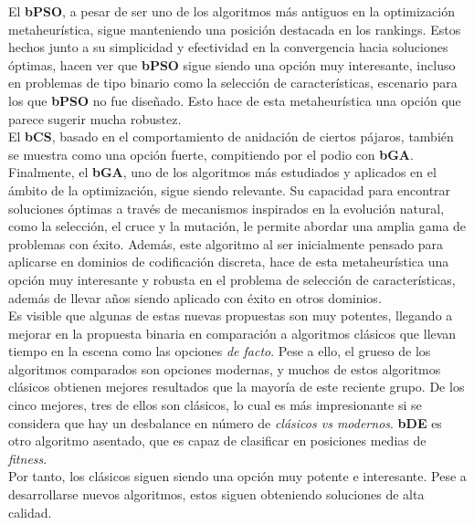 El \textbf{bPSO}, a pesar de ser uno de los algoritmos más antiguos en la optimización metaheurística, sigue manteniendo una posición destacada en los rankings. Estos hechos junto a su simplicidad y efectividad en la convergencia hacia soluciones óptimas, hacen ver que \textbf{bPSO} sigue siendo una opción muy interesante, incluso en problemas de tipo binario como la selección de características, escenario para los que \textbf{bPSO} no fue diseñado. Esto hace de esta metaheurística una opción que parece sugerir mucha robustez.\\[6pt]

El \textbf{bCS}, basado en el comportamiento de anidación de ciertos pájaros, también se muestra como una opción fuerte, compitiendo por el podio con \textbf{bGA}.\\[6pt]

Finalmente, el \textbf{bGA}, uno de los algoritmos más estudiados y aplicados en el ámbito de la optimización, sigue siendo relevante. Su capacidad para encontrar soluciones óptimas a través de mecanismos inspirados en la evolución natural, como la selección, el cruce y la mutación, le permite abordar una amplia gama de problemas con éxito. Además, este algoritmo al ser inicialmente pensado para aplicarse en dominios de codificación discreta, hace de esta metaheurística una opción muy interesante y robusta en el problema de selección de características, además de llevar años siendo aplicado con éxito en otros dominios.\\[6pt]

Es visible que algunas de estas nuevas propuestas son muy potentes, llegando a mejorar en la propuesta binaria en comparación a algoritmos clásicos que llevan tiempo en la escena como las opciones \textit{de facto}. Pese a ello, el grueso de los algoritmos comparados son opciones modernas, y muchos de estos algoritmos clásicos obtienen mejores resultados que la mayoría de este reciente grupo. De los cinco mejores, tres de ellos son clásicos, lo cual es más impresionante si se considera que hay un desbalance en número de \textit{clásicos vs modernos}. \textbf{bDE} es otro algoritmo asentado, que es capaz de clasificar en posiciones medias de \textit{fitness}.\\[6pt]

Por tanto, los clásicos siguen siendo una opción muy potente e interesante. Pese a desarrollarse nuevos algoritmos, estos siguen obteniendo soluciones de alta calidad.



